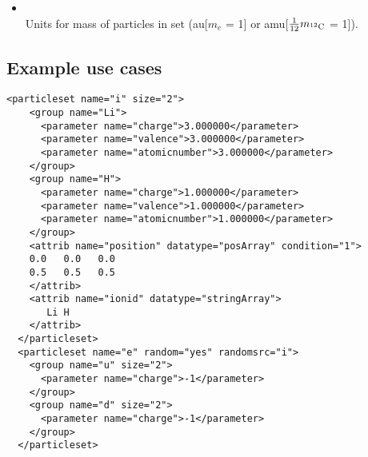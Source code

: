 \begin{itemize}
\item {} \\
Units for mass of particles in set (au[$m_e$ = 1] or amu[$\frac{1}{12}m_{\rm ^{12}C}$ = 1]).
\end{itemize}



\subsection{Example use cases}
\begin{minipage}{\linewidth}
\begin{lstlisting}[style=QMCPXML,caption=Particleset elements for ions and electrons randomizing electron start positions.]
  <particleset name="i" size="2">
    <group name="Li">
      <parameter name="charge">3.000000</parameter>
      <parameter name="valence">3.000000</parameter>
      <parameter name="atomicnumber">3.000000</parameter>
    </group>
    <group name="H">
      <parameter name="charge">1.000000</parameter>
      <parameter name="valence">1.000000</parameter>
      <parameter name="atomicnumber">1.000000</parameter>
    </group>
    <attrib name="position" datatype="posArray" condition="1">
    0.0   0.0   0.0
    0.5   0.5   0.5
    </attrib>
    <attrib name="ionid" datatype="stringArray">
       Li H
    </attrib>
  </particleset>
  <particleset name="e" random="yes" randomsrc="i">
    <group name="u" size="2">
      <parameter name="charge">-1</parameter>
    </group>
    <group name="d" size="2">
      <parameter name="charge">-1</parameter>
    </group>
  </particleset>                 
\end{lstlisting}
\end{minipage}

